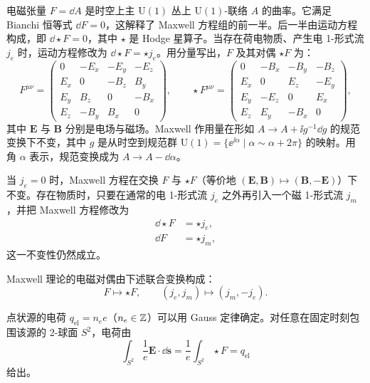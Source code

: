 电磁张量 $F=\dd A$ 是时空上主 $\mathrm{U}(1)$ 丛上 $\mathrm{U}(1)$-联络 $A$ 的曲率。它满足 Bianchi 恒等式 $\dd F=0$，这解释了 Maxwell 方程组的前一半。后一半由运动方程构成，即 $\dd\star F=0$，其中 $\star$ 是 Hodge 星算子。当存在荷电物质、产生电 1-形式流 $j_e$ 时，运动方程修改为 $\dd\star F=\star j_e$。用分量写出，$F$ 及其对偶 $\star F$ 为：
\[
F^{\mu\nu}=
\begin{pmatrix}
0 & -E_x & -E_y & -E_z\\
E_x & 0 & -B_z & B_y\\
E_y & B_z & 0 & -B_x\\
E_z & -B_y & B_x & 0
\end{pmatrix},
\qquad
\star F^{\mu\nu}=
\begin{pmatrix}
0 & -B_x & -B_y & -B_z\\
E_x & 0 & E_z & -E_y\\
E_y & -E_z & 0 & E_x\\
E_z & E_y & -B_x & 0
\end{pmatrix},
\]
其中 $\mathbf{E}$ 与 $\mathbf{B}$ 分别是电场与磁场。Maxwell 作用量在形如 $A\to A+\ii g^{-1}\dd g$ 的规范变换下不变，其中 $g$ 是从时空到规范群 $\mathrm{U}(1)=\{\ee^{\ii\alpha}\mid \alpha\sim\alpha+2\pi\}$ 的映射。用角 $\alpha$ 表示，规范变换成为 $A\to A-\dd\alpha$。

当 $j_e=0$ 时，Maxwell 方程在交换 $F$ 与 $\star F$（等价地 $(\mathbf{E},\mathbf{B})\mapsto(\mathbf{B},-\mathbf{E})$）下不变。存在物质时，只要在通常的电 1-形式流 $j_e$ 之外再引入一个磁 1-形式流 $j_m$，并把 Maxwell 方程修改为
\begin{align*}
\dd\star F&=\star j_e,\\
\dd F&=\star j_m,
\end{align*}
这一不变性仍然成立。

\begin{definition}[19.1]
Maxwell 理论的电磁对偶由下述联合变换构成：
\[
F\longmapsto\star F,\qquad (j_e,j_m)\longmapsto(j_m,-j_e).
\]
\end{definition}

点状源的电荷 $q_{\mathrm{el}}=n_e e$（$n_e\in\mathbb{Z}$）可以用 Gauss 定律确定。对任意在固定时刻包围该源的 2-球面 $S^2$，电荷由
\begin{equation}
\int_{S^2}\frac{1}{e}\mathbf{E}\cdot \dd\mathbf{s}
=\frac{1}{e}\int_{S^2}\star F=q_{\mathrm{el}} \tag{19.2}
\end{equation}
给出。

